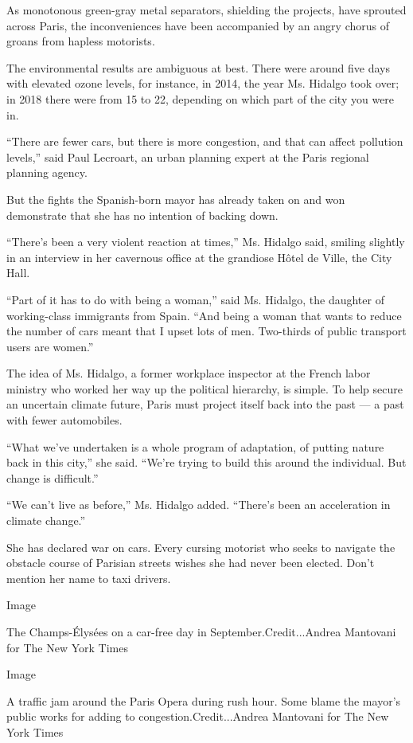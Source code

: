 As monotonous green-gray metal separators, shielding the projects, have
sprouted across Paris, the inconveniences have been accompanied by an
angry chorus of groans from hapless motorists.

The environmental results are ambiguous at best. There were around five
days with elevated ozone levels, for instance, in 2014, the year Ms.
Hidalgo took over; in 2018 there were from 15 to 22, depending on which
part of the city you were in.

``There are fewer cars, but there is more congestion, and that can
affect pollution levels,'' said Paul Lecroart, an urban planning expert
at the Paris regional planning agency.

But the fights the Spanish-born mayor has already taken on and won
demonstrate that she has no intention of backing down.

``There's been a very violent reaction at times,'' Ms. Hidalgo said,
smiling slightly in an interview in her cavernous office at the
grandiose Hôtel de Ville, the City Hall.

``Part of it has to do with being a woman,'' said Ms. Hidalgo, the
daughter of working-class immigrants from Spain. ``And being a woman
that wants to reduce the number of cars meant that I upset lots of men.
Two-thirds of public transport users are women.''

The idea of Ms. Hidalgo, a former workplace inspector at the French
labor ministry who worked her way up the political hierarchy, is simple.
To help secure an uncertain climate future, Paris must project itself
back into the past --- a past with fewer automobiles.

``What we've undertaken is a whole program of adaptation, of putting
nature back in this city,'' she said. ``We're trying to build this
around the individual. But change is difficult.''

``We can't live as before,'' Ms. Hidalgo added. ``There's been an
acceleration in climate change.''

She has declared war on cars. Every cursing motorist who seeks to
navigate the obstacle course of Parisian streets wishes she had never
been elected. Don't mention her name to taxi drivers.

Image

The Champs-Élysées on a car-free day in September.Credit...Andrea
Mantovani for The New York Times

Image

A traffic jam around the Paris Opera during rush hour. Some blame the
mayor's public works for adding to congestion.Credit...Andrea Mantovani
for The New York Times

